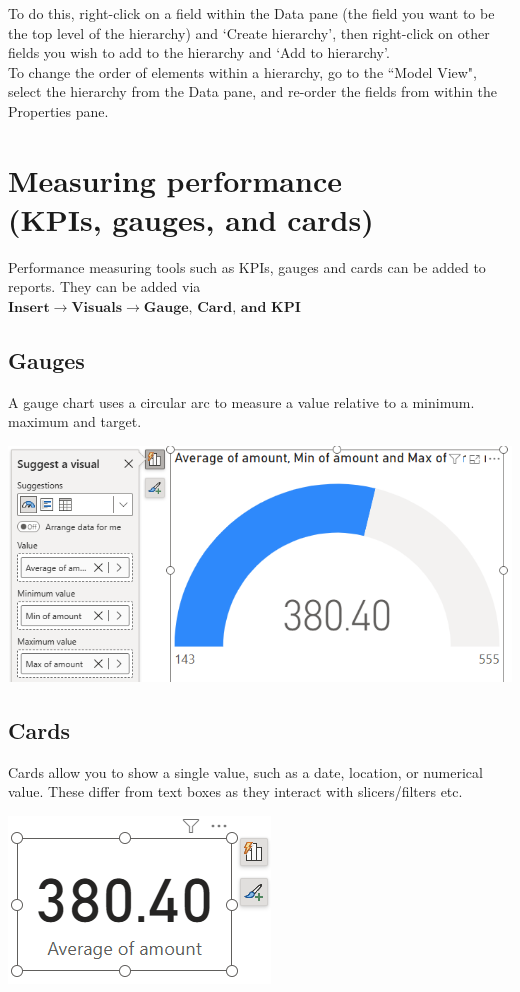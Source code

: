 \documentclass[10pt, openany, twocolumn]{book}
\begin{document}
To do this, right-click on a field within the Data pane (the field you want to be the top level of the hierarchy) and `Create hierarchy', then right-click on other fields you wish to add to the hierarchy and `Add to hierarchy'.\\

To change the order of elements within a hierarchy, go to the ``Model View", select the hierarchy from the Data pane, and re-order the fields from within the Properties pane.

\section[Measuring performance 
(KPIs, gauges, and cards)]{Measuring performance \\
(KPIs, gauges, and cards)}

Performance measuring tools such as KPIs, gauges and cards can be added to reports. They can be added via \\

$\textbf{Insert} \rightarrow \textbf{Visuals} \rightarrow \textbf{Gauge, Card, and KPI}$

\subsection*{Gauges}

A gauge chart uses a circular arc to measure a value relative to a minimum. maximum and target.
\begin{center}
\includegraphics[width=0.9\columnwidth]{images/gauge.png}
\end{center}

\subsection*{Cards}

Cards allow you to show a single value, such as a date, location, or numerical value. These differ from text boxes as they interact with slicers/filters etc.
\begin{center}
\includegraphics[width=0.45\columnwidth]{images/card.png}
\end{center}
\end{document}
